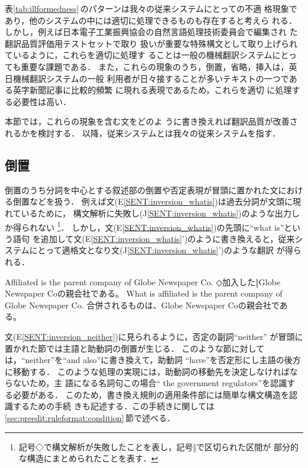 表\ref{tab:illformedness}\,のパターンは我々の従来システムにとっての不適
格現象であり，他のシステムの中には適切に処理できるものも存在すると考えら
れる．
しかし，例えば日本電子工業振興協会の自然言語処理技術委員会で編集され
た翻訳品質評価用テストセット\cite{NihonDenshiKogyoShinkoKyokai95}で取り
扱いが重要な特殊構文として取り上げられているように，これらを適切に処理す
ることは一般の機械翻訳システムにとっても重要な課題である．
また，これらの現象のうち，倒置，省略，挿入は，英日機械翻訳システムの一般
利用者が日々接することが多いテキストの一つである英字新聞記事に比較的頻繁
に現れる表現である\cite{Uenoda78,Horiuchi79,Tomita94}ため，これらを適切
に処理する必要性は高い．

本節では，これらの現象\cite{Egawa64,Yasui82,Greenbaum90}を含む文をどのよ
うに書き換えれば翻訳品質が改善されるかを検討する．
以降，従来システムとは我々の従来システムを指す．

\subsection{倒置}
\label{sec:object:inversion}

倒置のうち分詞を中心とする叙述部の倒置や否定表現が冒頭に置かれた文におけ
る倒置などを扱う．
例えば文(E\ref{SENT:inversion_whatis})は過去分詞が文頭に現れているために，
構文解析に失敗し(J\ref{SENT:inversion_whatis})のような出力しか得られない
\footnote{記号◇で構文解析が失敗したことを表し，記号‖で区切られた区間が
部分的な構造にまとめられたことを表す．}．
しかし，文(E\ref{SENT:inversion_whatis})の先頭に``what is''という語句
を追加して文(E\ref{SENT:inversion_whatis}')のように書き換えると，従来シ
ステムにとって適格文となり文(J\ref{SENT:inversion_whatis}')のような翻訳
が得られる．
\begin{SENT}
\sentE Affiliated is the parent company of Globe Newspaper Co.
\sentJ ◇加入した‖Globe Newspaper Coの親会社である。
\sentNewE What is affiliated is the parent company of Globe Newspaper Co.
\sentNewJ 合併されるものは、Globe Newspaper Coの親会社である。
\label{SENT:inversion_whatis}
\end{SENT}

文(E\ref{SENT:inversion_neither})に見られるように，否定の副詞``neither''
が冒頭に置かれた節では主語と助動詞の倒置が生じる．
このような節に対しては，``neither''を``and also''に書き換えて，助動詞
``have''を否定形にし主語の後方に移動する．
このような処理の実現には，助動詞の移動先を決定しなければならないため，主
語になる名詞句この場合`` the government regulators''を認識する必要がある．
このため，書き換え規則の適用条件部には簡単な構文構造を認識するための手続
きも記述する．この手続きに関しては
\ref{sec:preedit:ruleformat:condition}\,節で述べる．

